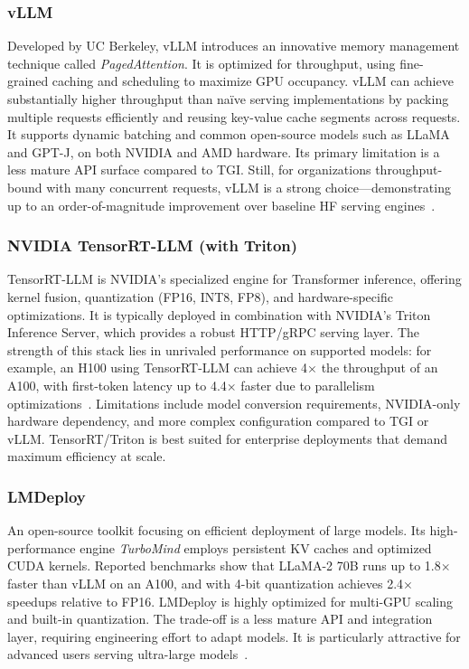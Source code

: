 \subsubsection{vLLM}
Developed by UC Berkeley, vLLM introduces an innovative memory management technique called \emph{PagedAttention}. It is optimized for throughput, using fine-grained caching and scheduling to maximize GPU occupancy. vLLM can achieve substantially higher throughput than naïve serving implementations by packing multiple requests efficiently and reusing key-value cache segments across requests. It supports dynamic batching and common open-source models such as LLaMA and GPT-J, on both NVIDIA and AMD hardware. Its primary limitation is a less mature API surface compared to TGI. Still, for organizations throughput-bound with many concurrent requests, vLLM is a strong choice—demonstrating up to an order-of-magnitude improvement over baseline HF serving engines~\cite{vllm-pagedattention,pagedattention_paper}.

\subsubsection{NVIDIA TensorRT-LLM (with Triton)}
TensorRT-LLM is NVIDIA’s specialized engine for Transformer inference, offering kernel fusion, quantization (FP16, INT8, FP8), and hardware-specific optimizations. It is typically deployed in combination with NVIDIA’s Triton Inference Server, which provides a robust HTTP/gRPC serving layer. The strength of this stack lies in unrivaled performance on supported models: for example, an H100 using TensorRT-LLM can achieve 4$\times$ the throughput of an A100, with first-token latency up to 4.4$\times$ faster due to parallelism optimizations~\cite{tensorrtllm-github,tensorrt_llm_docs}. Limitations include model conversion requirements, NVIDIA-only hardware dependency, and more complex configuration compared to TGI or vLLM. TensorRT/Triton is best suited for enterprise deployments that demand maximum efficiency at scale.~\cite{tensorrt_llm_docs,triton_docs}

\subsubsection{LMDeploy}
An open-source toolkit focusing on efficient deployment of large models. Its high-performance engine \emph{TurboMind} employs persistent KV caches and optimized CUDA kernels. Reported benchmarks show that LLaMA-2 70B runs up to 1.8$\times$ faster than vLLM on an A100, and with 4-bit quantization achieves 2.4$\times$ speedups relative to FP16. LMDeploy is highly optimized for multi-GPU scaling and built-in quantization. The trade-off is a less mature API and integration layer, requiring engineering effort to adapt models. It is particularly attractive for advanced users serving ultra-large models~\cite{lmdeploy-github}.

